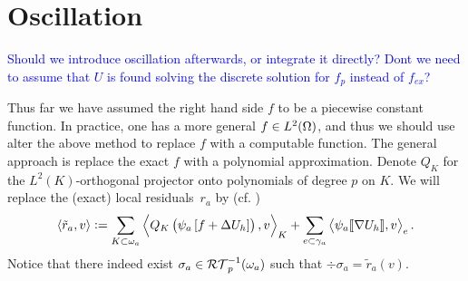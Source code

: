 \documentclass[thesis.tex]{subfiles}
\begin{document}
\section{Oscillation}
\textcolor{blue}{Should we introduce oscillation afterwards, or integrate it directly?
Dont we need to assume that $U$ is found solving the discrete solution for $f_{p}$ instead of $f_{ex}$?}

Thus far we have assumed the right hand side $f$ to be a piecewise constant function. In practice, one 
has a more general $f \in L^2(\Omega)$, and thus we should use alter the above method to replace $f$ with a computable function.
The general approach is replace the exact $f$ with a polynomial approximation. 
Denote $Q_K$ for the $L^2(K)$-orthogonal projector onto polynomials of degree $p$ on $K$. We will replace the (exact) local residuals~$r_a$ by  (cf. \cite[Thm~3.17]{ernequil})
\[
  \left \langle \tilde r_a, v \right \rangle := \sum_{K \subset \omega_a} \left \langle Q_K \left(\psi_a \left[f + \Delta U_h\right]\right), v \right \rangle_K 
  +\sum_{e \subset \gamma_a} \left \langle \psi_a \llbracket \nabla U_h\rrbracket, v \right \rangle_e.
\]
Notice that there indeed exist $\sigma_a \in \mathcal{RT}_p^{-1}(\omega_a)$ such that $\div \sigma_a = \tilde r_a(v)$.
\end{document}
